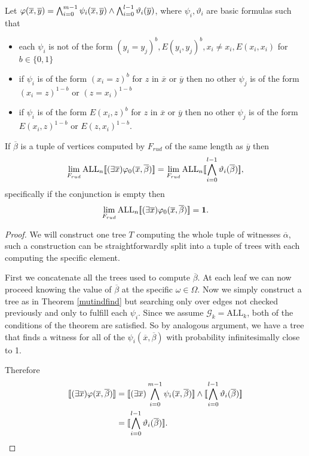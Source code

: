 \begin{thrm}
Let $\varphi(\overline x,\overline y)=\bigwedge_{i=0}^{m-1}\psi_i(\overline x,\overline y)\land \bigwedge_{i=0}^{l-1}\vartheta_i(\overline y)$, where $\psi_i,\vartheta_i$ are basic formulas such that
\begin{itemize}
\item each $\psi_i$ is not of the form $(y_i=y_j)^b,E(y_i,y_j)^b,x_i\not = x_i, E(x_i,x_i)$ for $b\in\{0,1\}$
\item if $\psi_i$ is of the form $(x_i=z)^b$ for $z$ in $\overline x$ or $\overline y$ then no other $\psi_j$ is of the form $(x_i=z)^{1-b}$ or $(z=x_i)^{1-b}$
\item if $\psi_i$ is of the form $E(x_i,z)^b$ for $z$ in $\overline x$ or $\overline y$ then no other $\psi_j$ is of the form $E(x_i,z)^{1-b}$ or $E(z,x_i)^{1-b}$.
\end{itemize}

If $\overline \beta$ is a tuple of vertices computed by $F_{rud}$ of the same length as $\overline y$ then \[\lim_{F_{rud}}\text{ALL}_n[\![(\exists \overline x)\varphi_0(\overline x,\overline \beta)]\!]=\lim_{F_{rud}}\text{ALL}_n[\![\bigwedge_{i=0}^{l-1}\vartheta_i(\overline \beta)]\!],\] specifically if the conjunction is empty then
\[\lim_{F_{rud}}\text{ALL}_n[\![(\exists \overline x)\varphi_0(\overline x,\overline \beta)]\!]=\textbf{1}.\]
\end{thrm}
\begin{proof} We will construct one tree $T$ computing the whole tuple of witnesses $\overline \alpha$, such a construction can be straightforwardly split into a tuple of trees with each computing the specific element.

First we concatenate all the trees used to compute $\overline \beta$. At each leaf we can now proceed knowing the value of $\overline \beta$ at the specific $\omega\in\Omega$. Now we simply construct a tree as in Theorem \ref{mutindfind} but searching only over edges not checked previously and only to fulfill each $\psi_i$. Since we assume $\mathcal{G}_k=\text{ALL}_k$, both of the conditions of the theorem are satisfied. So by analogous argument, we have a tree that finds a witness for all of the $\psi_i(\overline x,\overline \beta)$ with probability infinitesimally close to 1.

Therefore
\begin{align}
\bbl(\exists \overline x)\varphi(\overline x,\overline \beta)\bbr&=\bbl(\exists \overline x)\Land_{i=0}^{m-1}\psi_i(\overline x,\overline \beta)\bbr \land \bbl\Land_{i=0}^{l-1}\vartheta_i(\overline \beta)\bbr\\
&=\bbl\Land_{i=0}^{l-1}\vartheta_i(\overline \beta)\bbr.
\end{align}
\end{proof}


